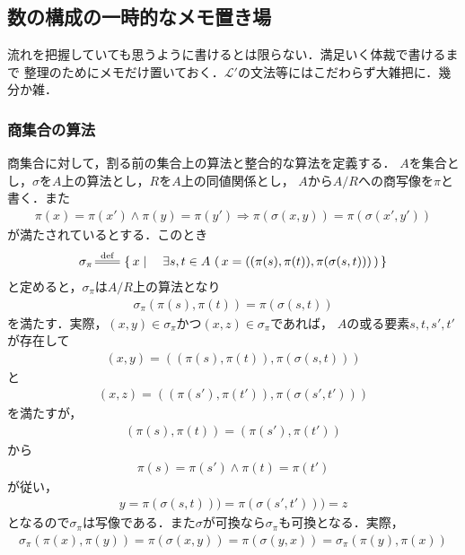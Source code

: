 \subsection{数の構成の一時的なメモ置き場}
	流れを把握していても思うように書けるとは限らない．満足いく体裁で書けるまで
	整理のためにメモだけ置いておく．$\mathcal{L}'$の文法等にはこだわらず大雑把に．幾分か雑．
	
\subsubsection{商集合の算法}
	商集合に対して，割る前の集合上の算法と整合的な算法を定義する．
	$A$を集合とし，$\sigma$を$A$上の算法とし，$R$を$A$上の同値関係とし，
	$A$から$A/R$への商写像を$\pi$と書く．また
	\begin{align}
		\pi(x) = \pi(x') \wedge \pi(y) = \pi(y')
		\Longrightarrow \pi\left(\sigma(x,y)\right) = \pi\left(\sigma(x',y')\right)
	\end{align}
	が満たされているとする．このとき
	\begin{align}
		\sigma_\pi \defeq \Set{x}{\exists s,t \in A\, 
		\left(\, x=((\pi(s),\pi(t)),\pi(\sigma(s,t)))\, \right)}
	\end{align}
	と定めると，$\sigma_\pi$は$A/R$上の算法となり
	\begin{align}
		\sigma_\pi(\pi(s),\pi(t)) = \pi(\sigma(s,t))
	\end{align}
	を満たす．実際，$(x,y) \in \sigma_\pi$かつ$(x,z) \in \sigma_\pi$であれば，
	$A$の或る要素$s,t,s',t'$が存在して
	\begin{align}
		(x,y) = ((\pi(s),\pi(t)),\pi(\sigma(s,t)))
	\end{align}
	と
	\begin{align}
		(x,z) = ((\pi(s'),\pi(t')),\pi(\sigma(s',t')))
	\end{align}
	を満たすが，
	\begin{align}
		(\pi(s),\pi(t)) = (\pi(s'),\pi(t'))
	\end{align}
	から
	\begin{align}
		\pi(s) = \pi(s') \wedge \pi(t) = \pi(t')
	\end{align}
	が従い，
	\begin{align}
		y = \pi(\sigma(s,t))) = \pi(\sigma(s',t'))) = z
	\end{align}
	となるので$\sigma_\pi$は写像である．また$\sigma$が可換なら$\sigma_\pi$も可換となる．実際，
	\begin{align}
		\sigma_\pi(\pi(x),\pi(y)) = \pi(\sigma(x,y))
		= \pi(\sigma(y,x)) = \sigma_\pi(\pi(y),\pi(x))
	\end{align}
